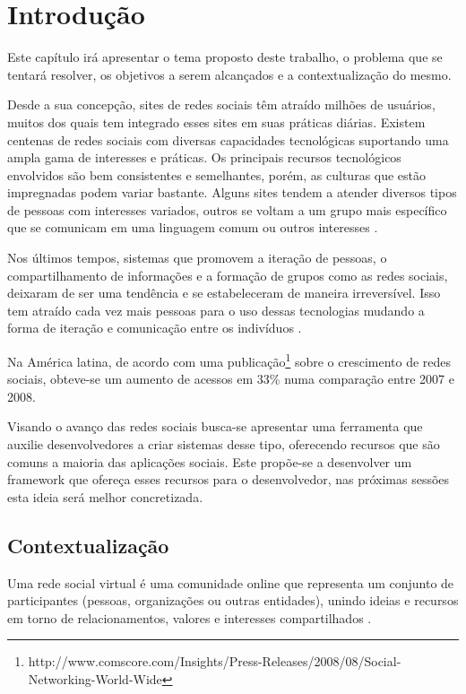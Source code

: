 \chapter[Introdução]{Introdução}

Este capítulo irá apresentar o tema proposto deste trabalho, o problema que se tentará resolver, os objetivos a serem alcançados e a contextualização do mesmo.

Desde a sua concepção, sites de redes sociais têm atraído milhões de usuários, muitos dos quais tem integrado esses sites em suas práticas diárias. Existem centenas de redes sociais com diversas capacidades tecnológicas suportando uma ampla gama de interesses e práticas. Os principais recursos tecnológicos envolvidos são bem consistentes e semelhantes, porém, as culturas que estão impregnadas podem variar bastante. Alguns sites tendem a atender diversos tipos de pessoas com interesses variados, outros se voltam a um grupo mais específico que se comunicam em uma linguagem comum ou outros interesses \cite{Boyd:Ellison:2007}.

Nos últimos tempos, sistemas que promovem a iteração de pessoas, o compartilhamento de informações e a formação de grupos como as redes sociais, deixaram de ser uma tendência e se estabeleceram de maneira irreversível. Isso tem atraído cada vez mais pessoas para o uso dessas tecnologias mudando a forma de iteração e comunicação entre os indivíduos \cite{Santana:Melo-Solarte:Neris:Miranda:Baranauskas:2009}.

Na América latina, de acordo com uma publicação\footnote{http://www.comscore.com/Insights/Press-Releases/2008/08/Social-Networking-World-Wide} sobre o crescimento de redes sociais, obteve-se um aumento de acessos em 33\% numa comparação entre 2007 e 2008.

Visando o avanço das redes sociais busca-se apresentar uma ferramenta que auxilie desenvolvedores a criar sistemas desse tipo, oferecendo recursos que são comuns a maioria das aplicações sociais. Este propõe-se a desenvolver um framework que ofereça esses recursos para o desenvolvedor, nas próximas sessões esta ideia será melhor concretizada.

\section{Contextualização}

Uma rede social virtual é uma comunidade online que representa um conjunto de participantes (pessoas, organizações ou outras entidades), unindo ideias e recursos em torno de relacionamentos, valores e interesses compartilhados \cite{Marteleto:2001}.


